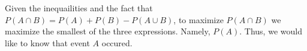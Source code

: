 Given the inequailities and the fact that $P(A \cap B) = P(A) + P(B) - P(A \cup B)$, to maximize $P(A \cap B)$ we maximize the smallest of the three expressions. Namely, $P(A)$. Thus, we would like to know that event $A$ occured.